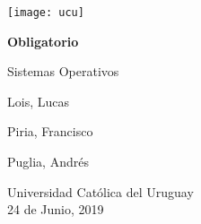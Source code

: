 \begin{titlepage}
    \begin{center}
        \texttt{[image: ucu]}

	\vspace*{5cm}

        \Huge
        \textbf{Obligatorio}

        \vspace{0.5cm}
        \LARGE
	Sistemas Operativos

        \vspace{3.5cm}

        Lois, Lucas

        Piria, Francisco

        Puglia, Andrés

        \vfill

        \Large
        Universidad Católica del Uruguay\\
	24 de Junio, 2019

    \end{center}
\end{titlepage}
